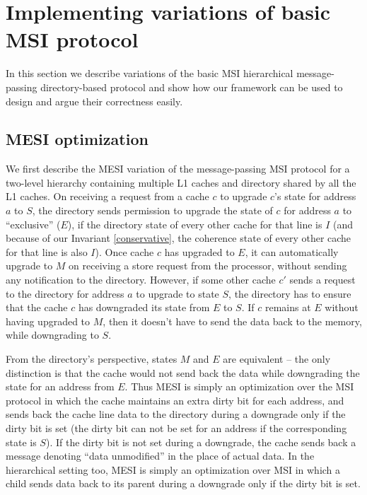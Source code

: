\section{Implementing variations of basic MSI protocol}
\label{sec:variations}


\newcommand{\FwdReq}[2]{\text{$FwdReq\langle#1,#2\rangle$}}
\newcommand{\FwdAck}{\text{$FwdAck$}}


In this section we describe variations of the basic MSI hierarchical
message-passing directory-based protocol and show how our framework can be used
to design and argue their correctness easily.

\subsection{MESI optimization}
We first describe the MESI variation of the message-passing MSI protocol for a
two-level hierarchy containing multiple L1 caches and directory shared by all
the L1 caches. On receiving a request from a cache $c$ to upgrade $c$'s state
for address $a$ to $S$, the directory sends permission to upgrade the state of
$c$ for address $a$ to ``exclusive'' ($E$), if the directory state of every
other cache for that line is $I$ (and because of our Invariant
\ref{conservative}, the coherence state of every other cache for that line is
also $I$). Once cache $c$ has upgraded to $E$, it can automatically upgrade to
$M$ on receiving a store request from the processor, without sending any
notification to the directory.  However, if some other cache $c'$ sends a
request to the directory for address $a$ to upgrade to state $S$, the directory
has to ensure that the cache $c$ has downgraded its state from $E$ to $S$. If
$c$ remains at $E$ without having upgraded to $M$, then it doesn't have to send
the data back to the memory, while downgrading to $S$.

From the directory's perspective, states $M$ and $E$ are equivalent -- the only
distinction is that the cache would not send back the data while downgrading the
state for an address from $E$. Thus MESI is simply an optimization over the MSI
protocol in which the cache maintains an extra dirty bit for each address, and
sends back the cache line data to the directory during a downgrade only if the
dirty bit is set (the dirty bit can not be set for an address if the
corresponding state is $S$). If the dirty bit is not set during a downgrade, the
cache sends back a message denoting ``data unmodified'' in the place of actual
data. In the hierarchical setting too, MESI is simply an optimization over MSI
in which a child sends data back to its parent during a downgrade only if the
dirty bit is set.

